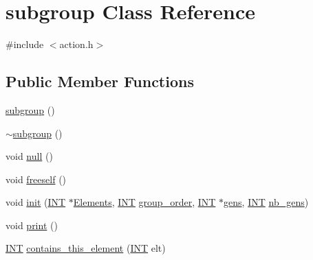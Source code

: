 \hypertarget{classsubgroup}{}\section{subgroup Class Reference}
\label{classsubgroup}


{\ttfamily \#include $<$action.\+h$>$}

\subsection*{Public Member Functions}
\begin{DoxyCompactItemize}
\item 
\mbox{\hyperlink{classsubgroup_ad39c9ae2b8141ef1edbd4e1dd9bf6ae3}{subgroup}} ()
\item 
\mbox{\hyperlink{classsubgroup_adbfc6bedf6bf5fa72e94852b4647b0c5}{$\sim$subgroup}} ()
\item 
void \mbox{\hyperlink{classsubgroup_a2ed11b774ef317eecda224471524f313}{null}} ()
\item 
void \mbox{\hyperlink{classsubgroup_a5e5396760b656084451289909587e28f}{freeself}} ()
\item 
void \mbox{\hyperlink{classsubgroup_a2e5ada6e3fcdcbb7ee77cf66f92694a0}{init}} (\mbox{\hyperlink{galois_8h_a09fddde158a3a20bd2dcadb609de11dc}{I\+NT}} $\ast$\mbox{\hyperlink{classsubgroup_a82c231e10723e796ad47411c8948cdbb}{Elements}}, \mbox{\hyperlink{galois_8h_a09fddde158a3a20bd2dcadb609de11dc}{I\+NT}} \mbox{\hyperlink{classsubgroup_acb55a787275d4983e8a3f9ae5a1007fb}{group\+\_\+order}}, \mbox{\hyperlink{galois_8h_a09fddde158a3a20bd2dcadb609de11dc}{I\+NT}} $\ast$\mbox{\hyperlink{classsubgroup_a8210a28fdd7e9f648f8b7ea37b84ade5}{gens}}, \mbox{\hyperlink{galois_8h_a09fddde158a3a20bd2dcadb609de11dc}{I\+NT}} \mbox{\hyperlink{classsubgroup_aff3a1e4d5c8dd46d159296a5c49e86e4}{nb\+\_\+gens}})
\item 
void \mbox{\hyperlink{classsubgroup_a45eec97b9961a7ebe6046eb458c45974}{print}} ()
\item 
\mbox{\hyperlink{galois_8h_a09fddde158a3a20bd2dcadb609de11dc}{I\+NT}} \mbox{\hyperlink{classsubgroup_a10e5ed8ed6d22d291a05ccb800333b88}{contains\+\_\+this\+\_\+element}} (\mbox{\hyperlink{galois_8h_a09fddde158a3a20bd2dcadb609de11dc}{I\+NT}} elt)
\end{DoxyCompactItemize}
